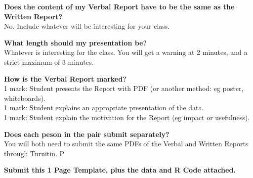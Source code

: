 \documentclass[bigtut]{quiz}\usepackage[]{graphicx}\usepackage[]{color}
\begin{document}
\begin{tutorial}
{\bf Does the content of my Verbal Report have to be the same as the Written Report?} \\
No. Include whatever will be interesting for your class.

{\bf What length should my presentation be?} \\
Whatever is interesting for the class. You will get a warning at 2 minutes, and a strict maximum of 3 minutes.

{\bf How is the Verbal Report marked?} \\
1 mark: Student presents the Report with PDF (or another method: eg poster, whiteboards). \\
1 mark: Student explains an appropriate presentation of the data. \\
1 mark: Student explain the motivation for the Report (eg impact or usefulness).

{\bf Does each peson in the pair submit separately?} \\
You will both need to  submit the same PDFs of the Verbal and Written Reports through Turnitin. P


\newpage
{}   {\tiny \bf  Submit this 1 Page Template, plus the data and R Code attached.}


\end{tutorial}
\end{document}
